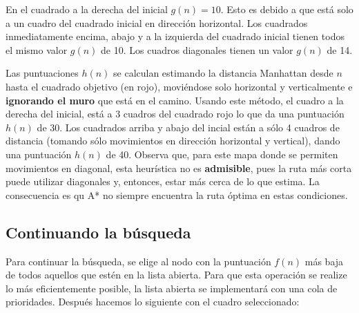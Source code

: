 En el cuadrado a la derecha del inicial \(g(n)=10\). Esto es debido a que está solo a un cuadro del cuadrado inicial en dirección horizontal. Los cuadrados inmediatamente encima, abajo y a la izquierda del cuadrado inicial tienen todos el mismo valor \(g(n)\) de 10. Los cuadros diagonales tienen un valor \(g(n)\) de 14.

Las puntuaciones \(h(n)\) se calculan estimando la distancia Manhattan desde $n$ hasta el cuadrado objetivo (en rojo), moviéndose solo horizontal y verticalmente e \textbf{ignorando el muro} que está en el camino. Usando este método, el cuadro a la derecha del inicial, está a 3 cuadros del cuadrado rojo lo que da una puntuación \(h(n)\) de 30. Los cuadrados arriba y abajo del incial están a sólo 4 cuadros de distancia (tomando sólo movimientos en dirección horizontal y vertical), dando una puntuación \(h(n)\) de 40.  Observa que, para este mapa donde se permiten movimientos en diagonal, esta heurística no es \textbf{admisible}, pues la ruta más corta puede utilizar diagonales y, entonces, estar más cerca de lo que estima.  La consecuencia es qu A* no siempre encuentra la ruta óptima en estas condiciones.

\subsection{Continuando la b\'usqueda}

Para continuar la búsqueda, se elige al nodo con la puntuación \(f(n)\) más baja de todos aquellos que estén en la lista abierta. Para que esta operación se realize lo más eficientemente posible, la lista abierta se implementará con una cola de prioridades. Después hacemos lo siguiente con el cuadro seleccionado:

